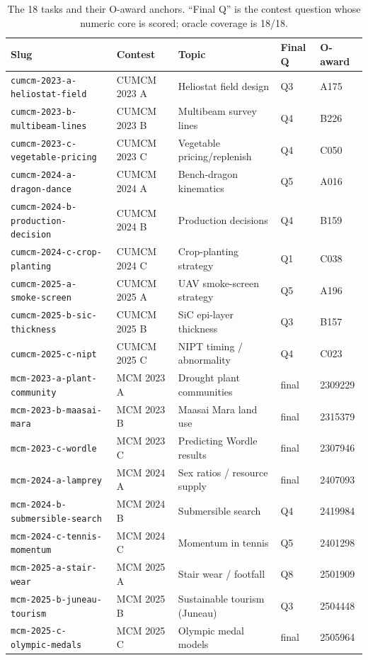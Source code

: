 \begin{table}[t]
\centering
\small
\caption{The 18 \bench{} tasks and their O-award anchors. ``Final Q'' is the contest question whose numeric core is scored; oracle coverage is 18/18.}
\label{tab:tasks}
\begin{tabular}{@{}lllll@{}}
\toprule
Slug & Contest & Topic & Final Q & O-award \\
\midrule
\texttt{cumcm-2023-a-heliostat-field}   & CUMCM 2023 A & Heliostat field design        & Q3 & A175 \\
\texttt{cumcm-2023-b-multibeam-lines}   & CUMCM 2023 B & Multibeam survey lines        & Q4 & B226 \\
\texttt{cumcm-2023-c-vegetable-pricing} & CUMCM 2023 C & Vegetable pricing/replenish   & Q4 & C050 \\
\texttt{cumcm-2024-a-dragon-dance}      & CUMCM 2024 A & Bench-dragon kinematics       & Q5 & A016 \\
\texttt{cumcm-2024-b-production-decision}& CUMCM 2024 B & Production decisions          & Q4 & B159 \\
\texttt{cumcm-2024-c-crop-planting}     & CUMCM 2024 C & Crop-planting strategy        & Q1 & C038 \\
\texttt{cumcm-2025-a-smoke-screen}      & CUMCM 2025 A & UAV smoke-screen strategy     & Q5 & A196 \\
\texttt{cumcm-2025-b-sic-thickness}     & CUMCM 2025 B & SiC epi-layer thickness       & Q3 & B157 \\
\texttt{cumcm-2025-c-nipt}              & CUMCM 2025 C & NIPT timing / abnormality     & Q4 & C023 \\
\texttt{mcm-2023-a-plant-community}     & MCM 2023 A & Drought plant communities     & final & 2309229 \\
\texttt{mcm-2023-b-maasai-mara}         & MCM 2023 B & Maasai Mara land use          & final & 2315379 \\
\texttt{mcm-2023-c-wordle}              & MCM 2023 C & Predicting Wordle results     & final & 2307946 \\
\texttt{mcm-2024-a-lamprey}             & MCM 2024 A & Sex ratios / resource supply  & final & 2407093 \\
\texttt{mcm-2024-b-submersible-search}  & MCM 2024 B & Submersible search            & Q4 & 2419984 \\
\texttt{mcm-2024-c-tennis-momentum}     & MCM 2024 C & Momentum in tennis            & Q5 & 2401298 \\
\texttt{mcm-2025-a-stair-wear}          & MCM 2025 A & Stair wear / footfall         & Q8 & 2501909 \\
\texttt{mcm-2025-b-juneau-tourism}      & MCM 2025 B & Sustainable tourism (Juneau)  & Q3 & 2504448 \\
\texttt{mcm-2025-c-olympic-medals}      & MCM 2025 C & Olympic medal models          & final & 2505964 \\
\bottomrule
\end{tabular}
\end{table}

